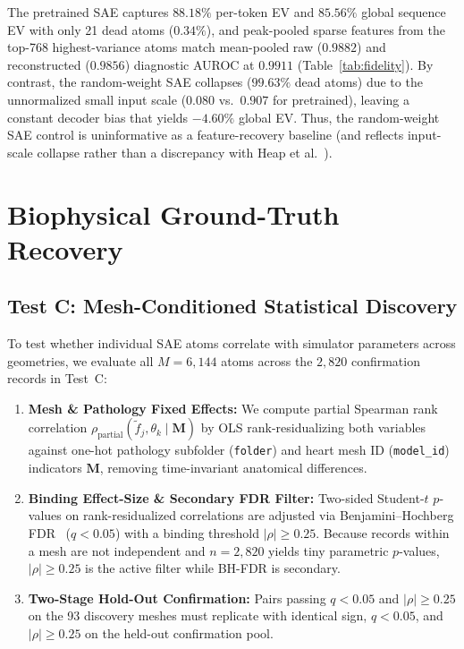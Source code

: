 \documentclass[10pt,twocolumn,letterpaper]{article}
\begin{document}
The pretrained SAE captures $88.18\%$ per-token EV and $85.56\%$ global sequence EV with only 21 dead atoms ($0.34\%$), and peak-pooled sparse features from the top-768 highest-variance atoms match mean-pooled raw ($0.9882$) and reconstructed ($0.9856$) diagnostic AUROC at $0.9911$ (Table~\ref{tab:fidelity}). By contrast, the random-weight SAE collapses ($99.63\%$ dead atoms) due to the unnormalized small input scale ($0.080$ vs.\ $0.907$ for pretrained), leaving a constant decoder bias that yields $-4.60\%$ global EV. Thus, the random-weight SAE control is uninformative as a feature-recovery baseline (and reflects input-scale collapse rather than a discrepancy with Heap et al.~\cite{heap2025saes}).

\section{Biophysical Ground-Truth Recovery}

\subsection{Test C: Mesh-Conditioned Statistical Discovery}
To test whether individual SAE atoms correlate with simulator parameters across geometries, we evaluate all $M = 6{,}144$ atoms across the $2{,}820$ confirmation records in Test~C:
\begin{enumerate}
    \item \textbf{Mesh \& Pathology Fixed Effects:} We compute partial Spearman rank correlation $\rho_{\text{partial}}(\tilde{f}_j, \theta_k \mid \bm{M})$ by OLS rank-residualizing both variables against one-hot pathology subfolder (\texttt{folder}) and heart mesh ID (\texttt{model\_id}) indicators $\bm{M}$, removing time-invariant anatomical differences.
    \item \textbf{Binding Effect-Size \& Secondary FDR Filter:} Two-sided Student-$t$ $p$-values on rank-residualized correlations are adjusted via Benjamini--Hochberg FDR~\cite{benjamini1995controlling} ($q < 0.05$) with a binding threshold $|\rho| \ge 0.25$. Because records within a mesh are not independent and $n = 2{,}820$ yields tiny parametric $p$-values, $|\rho| \ge 0.25$ is the active filter while BH-FDR is secondary.
    \item \textbf{Two-Stage Hold-Out Confirmation:} Pairs passing $q < 0.05$ and $|\rho| \ge 0.25$ on the 93 discovery meshes must replicate with identical sign, $q < 0.05$, and $|\rho| \ge 0.25$ on the held-out confirmation pool.
\end{enumerate}
\end{document}
